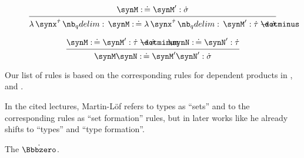 \begin{remark}
\begin{thmenum}
\begin{thmenum}
      \begin{paracol}{2}
        \begin{leftcolumn}
          \phantom{alignment hack}
          \begin{equation*}
            \begin{prooftree}
              \hypo{ \synM \syncoloneqq \synM': \syn\sigma }
              \infer1{ \qabs {\synx^{\syn\tau}} \synM \syncoloneqq \qabs {\synx^{\syn\tau}} \synM': \syn\tau \synimplies \syn\sigma }
            \end{prooftree}
          \end{equation*}
        \end{leftcolumn}

        \begin{rightcolumn}
          \phantom{alignment hack}
          \begin{equation*}
            \begin{prooftree}
              \hypo{ \synM \syncoloneqq \synM': \syn\tau \synimplies \syn\sigma }
              \hypo{ \synN \syncoloneqq \synN': \syn\tau }
              \infer2{ \synM \synN \syncoloneqq \synM' \synN': \syn\sigma }
            \end{prooftree}
          \end{equation*}
        \end{rightcolumn}
      \end{paracol}
    \end{thmenum}
  \end{thmenum}
\end{remark}
\begin{comments}
  \item Our list of rules is based on the corresponding rules for dependent products in , \cite[\S A.2]{UnivalentProject2024OctoberHoTT} and \cite[\S 8.1.10]{Mimram2020ProgramEqualsProof}.

  \item In the cited lectures, Martin-L\"of refers to types as \enquote{sets} and to the corresponding rules as \enquote{set formation} rules, but in later works like \cite{MartinLöf1994TypeJudgments} he already shifts to \enquote{types} and \enquote{type formation}.
\end{comments}

\begin{definition}\label{def:empty_type}
  The  \( \syn\Bbbzero \).
\end{definition}

